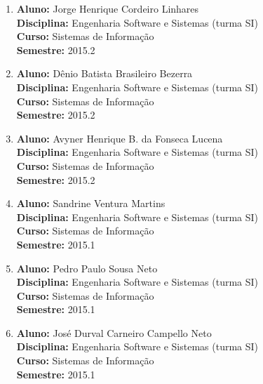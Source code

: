 \begin{enumerate}
\item   \textbf{Aluno:} Jorge Henrique Cordeiro Linhares \mbox{} \\
        \textbf{Disciplina:}  Engenharia Software e Sistemas (turma SI)\\
        \textbf{Curso:} Sistemas de Informação\\
        \textbf{Semestre:} 2015.2

\item   \textbf{Aluno:} Dênio Batista Brasileiro Bezerra \mbox{} \\
        \textbf{Disciplina:}  Engenharia Software e Sistemas (turma SI)\\
        \textbf{Curso:} Sistemas de Informação\\
        \textbf{Semestre:} 2015.2

\item   \textbf{Aluno:} Avyner Henrique B. da Fonseca Lucena \mbox{} \\
        \textbf{Disciplina:}  Engenharia Software e Sistemas (turma SI)\\
        \textbf{Curso:} Sistemas de Informação\\
        \textbf{Semestre:} 2015.2

\item   \textbf{Aluno:} Sandrine Ventura Martins \mbox{} \\
        \textbf{Disciplina:}  Engenharia Software e Sistemas (turma SI)\\
        \textbf{Curso:} Sistemas de Informação\\
        \textbf{Semestre:} 2015.1

\item   \textbf{Aluno:} Pedro Paulo Sousa Neto \mbox{} \\
        \textbf{Disciplina:}  Engenharia Software e Sistemas (turma SI)\\
        \textbf{Curso:} Sistemas de Informação\\
        \textbf{Semestre:} 2015.1

\item   \textbf{Aluno:} José Durval Carneiro Campello Neto \mbox{} \\
        \textbf{Disciplina:}  Engenharia Software e Sistemas (turma SI)\\
        \textbf{Curso:} Sistemas de Informação\\
        \textbf{Semestre:} 2015.1


\end{enumerate}

